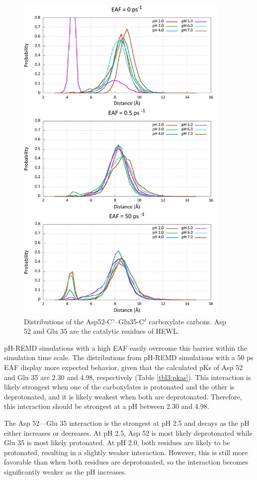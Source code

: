 \begin{figure}
 \includegraphics[width=4.06in, height=6.5in]{Catalytic_Distances.png}
 \caption{Distributions of the Asp52-C$^\gamma$--Glu35-C$^\delta$ carboxylate
          carbons. Asp 52 and Glu 35 are the catalytic residues of HEWL.}
 \label{fig3:cat_dist}
\end{figure}

pH-REMD simulations with a high EAF easily overcome this barrier within the
simulation time scale.  The distributions from pH-REMD simulations with a 50
ps EAF display more expected behavior, given that the calculated
pKs of Asp 52 and Glu 35 are 2.30 and 4.98, respectively
(Table \ref{tbl3:pkas}).  This interaction is likely strongest when one of the
carboxylates is protonated and the other is deprotonated, and it is likely
weakest when both are deprotonated.  Therefore, this interaction should be
strongest at a pH between 2.30 and 4.98.

The Asp 52---Glu 35 interaction is the strongest at pH 2.5 and decays as the pH
either increases or decreases.  At pH 2.5, Asp 52 is most likely deprotonated
while Glu 35 is most likely protonated.  At pH 2.0, both residues are likely to
be protonated, resulting in a slightly weaker interaction.  However, this is
still more favorable than when both residues are deprotonated, so the
interaction becomes significantly weaker as the pH increases.

